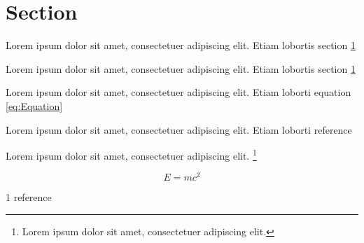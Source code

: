 \documentclass{article}
\providecommand{\cref}{section \ref}
\begin{document}
\section{Section} \label{sec:Section}

Lorem ipsum dolor sit amet, consectetuer adipiscing elit.
Etiam lobortis section \ref{sec:Section}

Lorem ipsum dolor sit amet, consectetuer adipiscing elit.
Etiam lobortis \cref{sec:Section}

Lorem ipsum dolor sit amet, consectetuer adipiscing elit.
Etiam loborti equation \eqref{eq:Equation}

Lorem ipsum dolor sit amet, consectetuer adipiscing elit.
Etiam loborti reference \cite{cite}

Lorem ipsum dolor sit amet, consectetuer adipiscing elit.
\footnote{
 Lorem ipsum dolor sit amet, consectetuer adipiscing elit.
}

\begin{equation} \label{eq:Equation}
E=mc^2
\end{equation}

\begin{thebibliography}{1}
 reference
\end{thebibliography}
\end{document}
